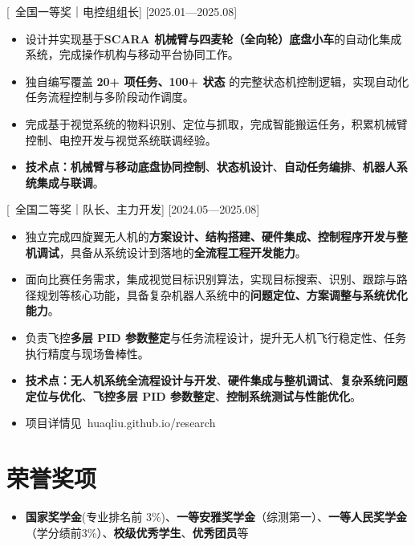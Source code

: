 \documentclass{resume}
\begin{document}
[\textcolor{deepred}{\ 全国一等奖｜电控组组长}]
[2025.01—2025.08]

\begin{itemize}
  \item 设计并实现基于\textbf{SCARA 机械臂与四麦轮（全向轮）底盘小车}的自动化集成系统，完成操作机构与移动平台协同工作。
  \item 独自编写覆盖 \textbf{20+ 项任务、100+ 状态} 的完整状态机控制逻辑，实现自动化任务流程控制与多阶段动作调度。
  \item 完成基于视觉系统的物料识别、定位与抓取，完成智能搬运任务，积累机械臂控制、电控开发与视觉系统联调经验。
  \item \textbf{\textcolor{deepred}{技术点：}}\textbf{机械臂与移动底盘协同控制}、\textbf{状态机设计}、\textbf{自动任务编排}、\textbf{机器人系统集成与联调}。\\
\end{itemize}

[\textcolor{deepred}{\ 全国二等奖｜队长、主力开发}]
[2024.05—2025.08]

\begin{itemize}
  \item 独立完成四旋翼无人机的\textbf{方案设计、结构搭建、硬件集成、控制程序开发与整机调试}，具备从系统设计到落地的\textbf{全流程工程开发能力}。
  \item 面向比赛任务需求，集成视觉目标识别算法，实现目标搜索、识别、跟踪与路径规划等核心功能，具备复杂机器人系统中的\textbf{问题定位、方案调整与系统优化能力}。
  \item 负责飞控\textbf{多层 PID 参数整定}与任务流程设计，提升无人机飞行稳定性、任务执行精度与现场鲁棒性。
  \item \textbf{\textcolor{deepred}{技术点：}}\textbf{无人机系统全流程设计与开发}、\textbf{硬件集成与整机调试}、\textbf{复杂系统问题定位与优化}、\textbf{飞控多层 PID 参数整定}、\textbf{控制系统测试与性能优化}。\\
  \item 项目详情见\ huaqliu.github.io/research
\end{itemize}


\section{\textcolor{myblue}{荣誉奖项}}

\begin{itemize}
  \item \textbf{国家奖学金}(专业排名前 3\%)、\textbf{一等安雅奖学金}（综测第一）、\textbf{一等人民奖学金}（学分绩前3\%）、\textbf{校级优秀学生}、\textbf{优秀团员}等
\end{itemize}
\end{document}
